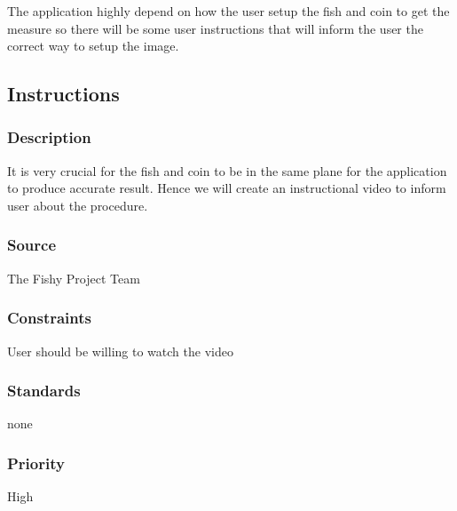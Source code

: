 The application highly depend on how the user setup the fish and coin to get the measure so there will be some user instructions that will inform the user the correct way to setup the image.

\subsection{Instructions}
\subsubsection{Description}
It is very crucial for the fish and coin to be in the same plane for the application to produce accurate result. Hence we will create an instructional video to inform user about the procedure.
\subsubsection{Source}
The Fishy Project Team
\subsubsection{Constraints}
User should be willing to watch the video
\subsubsection{Standards}
none
\subsubsection{Priority}
High